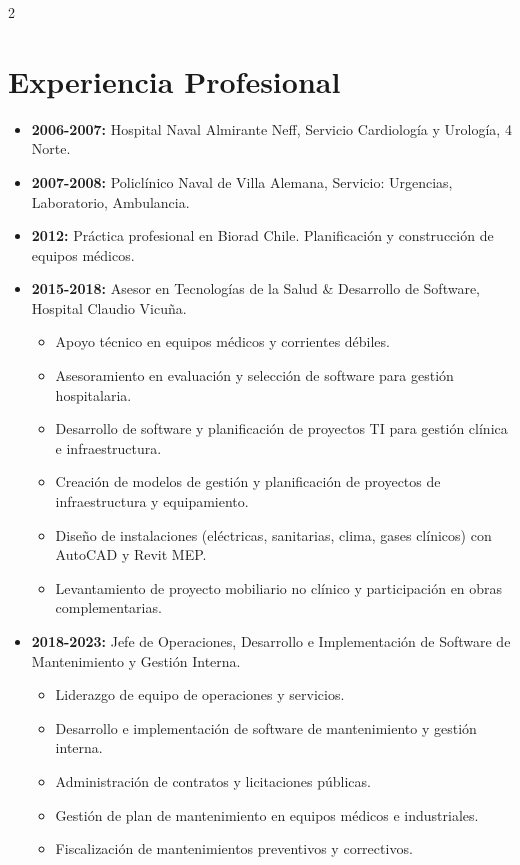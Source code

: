 \documentclass[lighthipster]{simplehipstercv}
\begin{document}
\begin{paracol}{2}
\section*{Experiencia Profesional}
\begin{itemize}
    \item \textbf{2006-2007:} Hospital Naval Almirante Neff, Servicio Cardiología y Urología, 4 Norte.
    \item \textbf{2007-2008:} Policlínico Naval de Villa Alemana, Servicio: Urgencias, Laboratorio, Ambulancia.
    \item \textbf{2012:} Práctica profesional en Biorad Chile. Planificación y construcción de equipos médicos.
    \item \textbf{2015-2018:} Asesor en Tecnologías de la Salud \& Desarrollo de Software, Hospital Claudio Vicuña.
    \begin{itemize}
        \item Apoyo técnico en equipos médicos y corrientes débiles.
        \item Asesoramiento en evaluación y selección de software para gestión hospitalaria.
        \item Desarrollo de software y planificación de proyectos TI para gestión clínica e infraestructura.
        \item Creación de modelos de gestión y planificación de proyectos de infraestructura y equipamiento.
        \item Diseño de instalaciones (eléctricas, sanitarias, clima, gases clínicos) con AutoCAD y Revit MEP.
        \item Levantamiento de proyecto mobiliario no clínico y participación en obras complementarias.
    \end{itemize}
    \item \textbf{2018-2023:} Jefe de Operaciones, Desarrollo e Implementación de Software de Mantenimiento y Gestión Interna.
    \begin{itemize}
        \item Liderazgo de equipo de operaciones y servicios.
        \item Desarrollo e implementación de software de mantenimiento y gestión interna.
        \item Administración de contratos y licitaciones públicas.
        \item Gestión de plan de mantenimiento en equipos médicos e industriales.
        \item Fiscalización de mantenimientos preventivos y correctivos.

\end{itemize}
\end{itemize}
\end{paracol}
\end{document}
